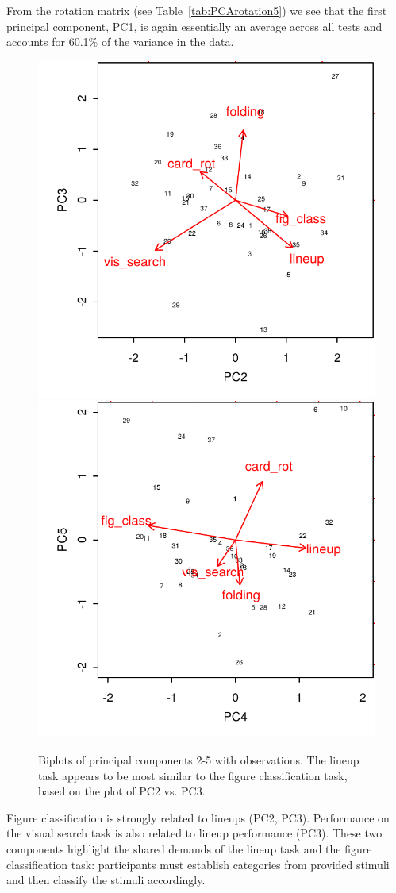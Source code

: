 \documentclass[11pt]{isuthesis}\usepackage[]{graphicx}\usepackage[]{color}
\newenvironment{knitrout}{}{} %
\begin{document}
From the rotation matrix (see Table~\ref{tab:PCArotation5}) we see that  
the first principal component, PC1, is again essentially an average across all tests and accounts for 60.1\% of the variance in the data. 

\begin{knitrout}
\color{fgcolor}\begin{figure}

{\centering \includegraphics[width=.45\linewidth]{Figure/VisualAptitude/fig-biplots-pca5-1} 
\includegraphics[width=.45\linewidth]{Figure/VisualAptitude/fig-biplots-pca5-2} 

}

\caption[Biplots of principal components 2-5 with observations.]{Biplots of principal components 2-5 with observations. The lineup task appears to be most similar to the figure classification task, based on the plot of PC2 vs. PC3.  \label{fig:biplots5}}\label{fig:biplots-pca5}
\end{figure}


\end{knitrout}

Figure classification is strongly related to lineups (PC2, PC3). Performance on the visual search task  is also related to lineup performance (PC3). These two components highlight the shared demands of the lineup task and the figure classification task: participants must establish categories from provided stimuli and then classify the stimuli accordingly. 
\end{document}
